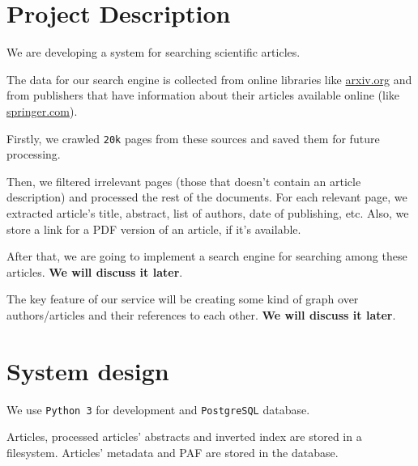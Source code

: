 \section{Project Description}

We are developing a system for searching scientific articles.

The data for our search engine is collected from online libraries like \url{arxiv.org} 
and from publishers that have information about their articles available online (like \url{springer.com}).

Firstly, we crawled \texttt{20k} pages from these sources and saved them for future processing.

Then, we filtered irrelevant pages (those that doesn't contain an article description) and processed the rest of the documents.
For each relevant page, we extracted article's title, abstract, list of authors, date of publishing, etc.
Also, we store a link for a PDF version of an article, if it's available.

After that, we are going to implement a search engine for searching among these articles. \textbf{We will discuss it later}.

The key feature of our service will be creating some kind of graph over authors/articles and their references to each other. \textbf{We will discuss it later}.

\section{System design}
We use \texttt{Python 3}  for development and \texttt{PostgreSQL} database.

Articles, processed articles' abstracts and inverted index are stored in a filesystem.
Articles' metadata and PAF are stored in the database.


